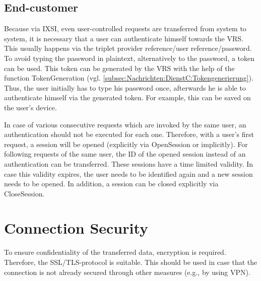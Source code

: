\subsection*{End-customer}
Because via IXSI, even user-controlled requests are transferred from system to system, it is necessary that a user can authenticate himself towards the VRS.
This usually happens via the triplet provider reference/user reference/password. To avoid typing the password in plaintext, alternatively to the password, a token can be used. This token can be generated by the VRS with the help of the function  TokenGeneration (vgl. \cref{subsec:Nachrichten:DienstC:Tokengenerierung}).
Thus, the user initially has to type his password once, afterwards he is able to authenticate himself via the generated token. For example, this can be saved on the user's device. 

In case of various consecutive requests which are invoked by the same user, an authentication should not be executed for each one. Therefore, with a user's first request, a session will be opened (explicitly via OpenSession or implicitly). For following requests of the same user, the ID of the opened session instead of an authentication can be transferred. These sessions have a time limited validity. In case this validity expires, the user needs to be identified again and a new session needs to be opened. In addition, a session can be closed explicitly via CloseSession.

\section{Connection Security}
To ensure confidentiality of the transferred data, encryption is required. Therefore, the SSL/TLS-protocol is suitable. This should be used in case that the connection is not already secured through other measures (e.g., by using VPN).

